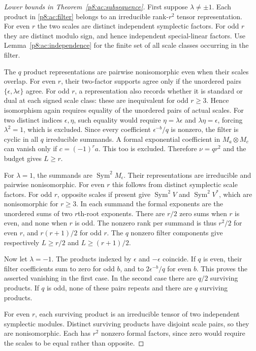 \documentclass[11pt,a4paper]{article}
\theoremstyle{definition}
\theoremstyle{remark}
\numberwithin{equation}{section}
\begin{document}
\begin{proof}[Lower bounds in Theorem~\ref{p8:ac:subsequence}]
First suppose $\lambda\ne\pm1$. Each product in
\eqref{p8:ac:filter} belongs to an irreducible rank-$r^2$ tensor
representation. For even $r$ the two scales are distinct independent
symplectic factors. For odd $r$ they are distinct modulo sign, and
hence independent special-linear factors. Use
Lemma~\ref{p8:ac:independence} for the finite set of all scale classes
occurring in the filter.

The $q$ product representations are pairwise nonisomorphic even
when their scales overlap. For even $r$, their two-factor supports
agree only if the unordered pairs
$\{\epsilon,\lambda\epsilon\}$ agree. For odd $r$, a representation
also records whether it is standard or dual at each signed scale
class: these are inequivalent for odd $r\ge3$. Hence isomorphism
again requires equality of the unordered pairs of actual scales.
For two distinct indices $\epsilon,\eta$, such equality would require
$\eta=\lambda\epsilon$ and $\lambda\eta=\epsilon$, forcing
$\lambda^2=1$, which is excluded. Since every coefficient
$\epsilon^{-b}/q$ is nonzero, the filter is cyclic in all $q$
irreducible summands. A formal exponential coefficient in
$M_a\otimes M_c$ can vanish only if $c=(-1)^r a$.
This too is excluded. Therefore $\nu=qr^2$ and the budget gives
$L\ge r$.

For $\lambda=1$, the summands are
$\operatorname{Sym}^2 M_\epsilon$. Their representations are
irreducible and pairwise nonisomorphic. For even $r$ this follows
from distinct symplectic scale factors. For odd $r$, opposite scales
if present give $\operatorname{Sym}^2 V$ and
$\operatorname{Sym}^2 V^*$, which are nonisomorphic for $r\ge3$.
In each summand the formal exponents are the unordered sums of two
$r$th-root exponents. There are $r/2$ zero sums when $r$ is even,
and none when $r$ is odd. The nonzero rank per summand is thus
$r^2/2$ for even $r$, and $r(r+1)/2$ for odd $r$.
The $q$ nonzero filter components give respectively
$L\ge r/2$ and $L\ge(r+1)/2$.

Now let $\lambda=-1$. The products indexed by $\epsilon$ and
$-\epsilon$ coincide. If $q$ is even, their filter coefficients sum
to zero for odd $b$, and to $2\epsilon^{-b}/q$ for even $b$.
This proves the asserted vanishing in the first case. In the second
case there are $q/2$ surviving products. If $q$ is odd, none of these
pairs repeats and there are $q$ surviving products.

For even $r$, each surviving product is an irreducible tensor of two
independent symplectic modules. Distinct surviving products have
disjoint scale pairs, so they are nonisomorphic. Each has $r^2$
nonzero formal factors, since zero would require the scales to be
equal rather than opposite.


\end{proof}
\end{document}
